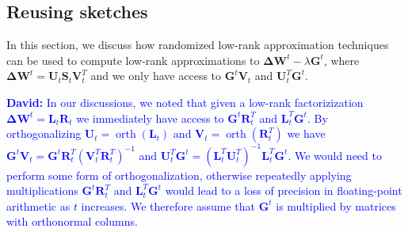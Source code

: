 \documentclass[11pt]{article}
\newcommand{\mat}[1]{\bm{#1}}
\newcommand{\DW}{\mat{\Delta W}}
\DeclareMathOperator{\orth}{orth}
\newcommand{\David}[1]{\textcolor{blue}{\textbf{David:} #1}}
\begin{document}
\subsection{Reusing sketches}
In this section, we discuss how randomized low-rank approximation techniques can be used to compute low-rank approximations to $\DW^t - \lambda \bm{G}^t$, where $\DW^t = \bm{U}_t \bm{S}_t \bm{V}_t^T$ and we only have access to $\bm{G}^t \bm{V}_t$ and $\bm{U}_t^T\bm{G}^t$.

\begin{remark}
    \David{In our discussions, we noted that given a low-rank factorizization $\DW^t = \bm{L}_t \bm{R}_t$ we immediately have access to $\bm{G}^t \bm{R}_t^T$ and $\bm{L}_t^T \bm{G}^t$. By orthogonalizing $\bm{U}_t = \orth(\bm{L}_t)$ and $\bm{V}_t = \orth(\bm{R}_t^T)$ we have $\bm{G}^t \bm{V}_t = \bm{G}^t \bm{R}_t^T(\bm{V}_t^T \bm{R}_t^T)^{-1}$ and $\bm{U}_t^T \bm{G}^t = (\bm{L}_t^T \bm{U}_t^T)^{-1}\bm{L}_t^T\bm{G}^t$. We would need to perform some form of orthogonalization, otherwise repeatedly applying multiplications $\bm{G}^t \bm{R}_t^T$ and $\bm{L}_t^T \bm{G}^t$ would lead to a loss of precision in floating-point arithmetic as $t$ increases. We therefore assume that $\bm{G}^t$ is multiplied by matrices with orthonormal columns.}
\end{remark}
\end{document}
